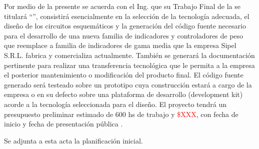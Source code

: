 \documentclass[11pt]{charter}
\begin{document}
Por medio de la presente se acuerda con el Ing. \authorname\hspace{1px} que su Trabajo Final de la \degreename\hspace{1px} se titulará ``\ttitle'', consistirá esencialmente en la selección de la tecnología adecuada, el diseño de los circuitos esquemáticos y la generación del código fuente necesario para el desarrollo de una nueva familia de indicadores y controladores de peso que reemplace a familia de indicadores de gama media que la empresa Sipel S.R.L. fabrica y comercializa actualmente. También se generará la documentación pertinente para realizar una transferencia tecnológica que le permita a la empresa el posterior mantenimiento o modificación del producto final. El código fuente generado será testeado sobre un prototipo cuya construcción estará a cargo de la empresa o en su defecto sobre una plataforma de desarrollo (development kit) acorde a la tecnología seleccionada para el diseño. El proyecto tendrá un presupuesto preliminar estimado de 600 hs de trabajo y \textcolor{red}{\$XXX}, con fecha de inicio \fechaInicioName\hspace{1px} y fecha de presentación pública \fechaFinalName.

Se adjunta a esta acta la planificación inicial.

\vfill
\end{document}
